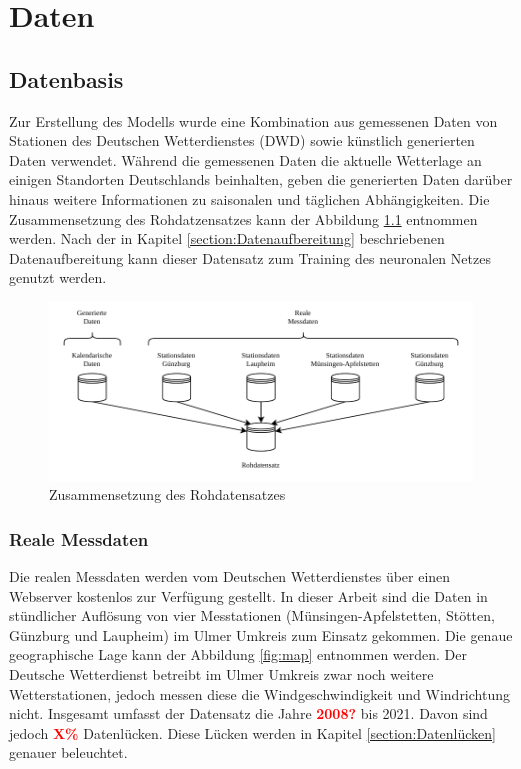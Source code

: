 \documentclass[
12pt, %
toc=listofnumbered, %
toc=chapterentrydotfill, %
numbers=noenddot, %
captions=tableheading, %
bibliography=numbered
]{scrreprt}
\let\Oldsection\section
\renewcommand{\section}{\FloatBarrier\Oldsection}
\let\Oldsubsection\subsection
\renewcommand{\subsection}{\FloatBarrier\Oldsubsection}
\newcommand{\highlight}[1]{\textbf{\textcolor{red}{#1}}}
\begin{document}
\chapter{Daten}

\section{Datenbasis}
Zur Erstellung des Modells wurde eine Kombination aus gemessenen Daten von Stationen des Deutschen Wetterdienstes (DWD) sowie künstlich generierten Daten verwendet.
Während die gemessenen Daten die aktuelle Wetterlage an einigen Standorten Deutschlands beinhalten, geben die generierten Daten darüber hinaus weitere Informationen zu saisonalen und täglichen Abhängigkeiten. Die Zusammensetzung des Rohdatzensatzes kann der Abbildung \ref{fig:rohdatensatz} entnommen werden. Nach der in Kapitel \ref{section:Datenaufbereitung} beschriebenen Datenaufbereitung kann dieser Datensatz zum Training des neuronalen Netzes genutzt werden.

\begin{figure}[tph]
	\begin{center}
		\includegraphics[]{./images/rohdatensatz.pdf}
		\caption{Zusammensetzung des Rohdatensatzes}
		\label{fig:rohdatensatz}
	\end{center}
\end{figure}

\subsection{Reale Messdaten}
Die realen Messdaten werden vom Deutschen Wetterdienstes über einen Webserver kostenlos zur Verfügung gestellt. In dieser Arbeit sind die Daten in stündlicher Auflösung von vier Messtationen (Münsingen-Apfelstetten, Stötten, Günzburg und Laupheim) im Ulmer Umkreis zum Einsatz gekommen. Die genaue geographische Lage kann der Abbildung \ref{fig:map} entnommen werden. Der Deutsche Wetterdienst betreibt im Ulmer Umkreis zwar noch weitere Wetterstationen, jedoch messen diese die Windgeschwindigkeit und Windrichtung nicht. Insgesamt umfasst der Datensatz die Jahre \highlight{2008?} bis 2021. Davon sind jedoch \highlight{X\%} Datenlücken. Diese Lücken werden in Kapitel \ref{section:Datenlücken} genauer beleuchtet. 
\end{document}
